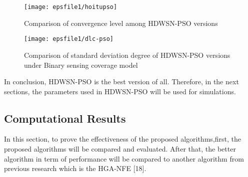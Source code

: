 \documentclass[final]{elsarticle}
\begin{document}
\begin{figure*}[h]
	\texttt{[image: epsfile1/hoitupso]}
	\centering	\caption{Comparison of convergence level among HDWSN-PSO versions }
	\label{Fig.11}       %
\end{figure*}
\begin{figure*}[h]
	\texttt{[image: epsfile1/dlc-pso]}
	\centering	\caption{Comparison of standard deviation degree of HDWSN-PSO versions under Binary sensing coverage model}
	\label{Fig.13}       %
\end{figure*}
In conclusion, HDWSN-PSO is the best version of all. Therefore, in the next sections, the parameters used in HDWSN-PSO will be used for simulations. 

\subsection{Computational Results}
In this section, to prove the effectiveness of the proposed algorithms,first, the proposed algorithms will be compared and evaluated. After that, the better algorithm in term of performance will be compared to another algorithm from previous research which is the HGA-NFE \cite{b18} [18]. 
\end{document}
